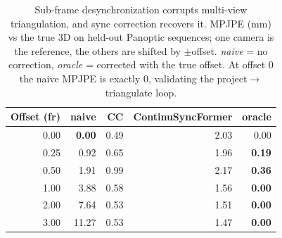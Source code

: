 \begin{table}[t]
\centering
\caption{Sub-frame desynchronization corrupts multi-view triangulation, and sync
correction recovers it. MPJPE (mm) vs the true 3D on held-out Panoptic sequences;
one camera is the reference, the others are shifted by $\pm$offset. \emph{naive}
= no correction, \emph{oracle} = corrected with the true offset. At offset 0 the
naive MPJPE is exactly 0, validating the project$\rightarrow$triangulate loop.}
\label{tab:b3_triangulation}
\begin{tabular}{rrrrr}
\toprule
Offset (fr) & naive & CC & ContinuSyncFormer & oracle \\
\midrule
0.00 & \textbf{0.00} & 0.49 & 2.03 & 0.00 \\
0.25 & 0.92 & 0.65 & 1.96 & \textbf{0.19} \\
0.50 & 1.91 & 0.99 & 2.17 & \textbf{0.36} \\
1.00 & 3.88 & 0.58 & 1.56 & \textbf{0.00} \\
2.00 & 7.64 & 0.53 & 1.51 & \textbf{0.00} \\
3.00 & 11.27 & 0.53 & 1.47 & \textbf{0.00} \\
\bottomrule
\end{tabular}
\end{table}

